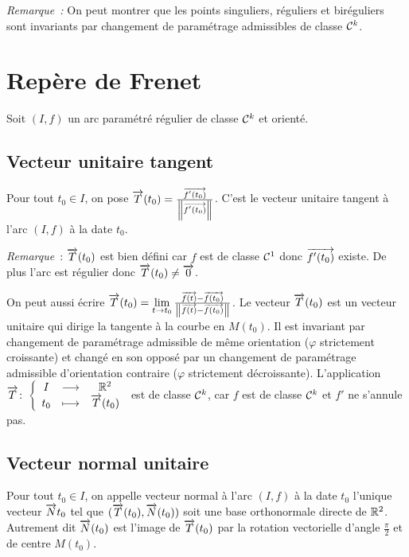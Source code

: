 \emph{Remarque~:} On peut montrer que les points singuliers, réguliers et biréguliers sont invariants par changement de paramétrage admissibles de classe $\mathcal{C}^{k}$.

\section{Repère de Frenet}

Soit $(I, f)$ un arc paramétré régulier de classe $\mathcal{C}^{k}$ et orienté.

\subsection{Vecteur unitaire tangent}

\begin{defdef}
  Pour tout $t_0 \in I$, on pose $\overrightarrow{T}(t_0) = \frac{\overrightarrow{f'(t_0)}}{\left\lVert\overrightarrow{f'(t_0)}\right\rVert}$. C'est le vecteur unitaire tangent à l'arc $(I, f)$ à la date $t_0$.
\end{defdef}

\emph{Remarque}~: $\overrightarrow{T}(t_0)$ est bien défini car $f$ est de classe $\mathcal{C}^{1}$ donc $\overrightarrow{f'(t_0)}$ existe. De plus l'arc est régulier donc $\overrightarrow{T}(t_0)\neq \overrightarrow{0}$.

On peut aussi écrire $\overrightarrow{T}(t_0) = \lim\limits_{t \to t_0} \frac{\overrightarrow{f(t)}-\overrightarrow{f(t_0)}}{\left\lVert\overrightarrow{f(t)}-\overrightarrow{f(t_0)}\right\rVert}$. Le vecteur $\overrightarrow{T}(t_0)$ est un vecteur unitaire qui dirige la tangente à la courbe en $M(t_0)$. Il est invariant par changement de paramétrage admissible de même orientation ($\varphi$ strictement croissante) et changé en son opposé par un changement de paramétrage admissible d'orientation contraire ($\varphi$ strictement décroissante). L'application $\overrightarrow{T}\colon \left\{\begin{array}{ccc} I & \longrightarrow &\mathbb{R}^2\\ t_0 & \longmapsto & \overrightarrow{T}(t_0) \end{array} \right.$ est de classe $\mathcal{C}^{k}$, car $f$ est de classe $\mathcal{C}^{k}$ et $f'$ ne s'annule pas.

\subsection{Vecteur normal unitaire}

\begin{defdef}
  Pour tout $t_0 \in I$, on appelle vecteur normal à l'arc $(I, f)$ à la date $t_0$ l'unique vecteur $\overrightarrow{N}{t_0}$ tel que $(\overrightarrow{T}(t_0), \overrightarrow{N}(t_0))$ soit une base orthonormale directe de $\mathbb{R}^2$. Autrement dit $\overrightarrow{N}(t_0)$ est l'image de $\overrightarrow{T}(t_0)$ par la rotation vectorielle d'angle $\frac{\pi}{2}$ et de centre $M(t_0)$.
\end{defdef}

